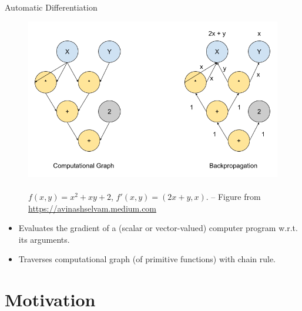 \documentclass{beamer}
\begin{document}
\begin{frame}{Automatic Differentiation}

    \begin{figure}
        \begin{minipage}[c]{0.7\textwidth}
            \includegraphics[scale=0.3]{imgs/autograd.png}
        \end{minipage}
        \begin{minipage}[l]{0.27\textwidth}
            \caption{
            \\$f(x,y) = x^2+xy+2$, $f'(x,y) = (2x+y,x).$
            -- Figure from             %
            \url{https://avinashselvam.medium.com}
            }
        \end{minipage}
        \label{fig:autograd-illustration}
    \end{figure}
    
    \begin{itemize}
        \item Evaluates the gradient of a (scalar or vector-valued) computer program w.r.t. its arguments.
        \item \pause Traverses computational graph (of primitive functions) with chain rule.
    \end{itemize}
    
\end{frame}


\section{Motivation}
\end{document}
